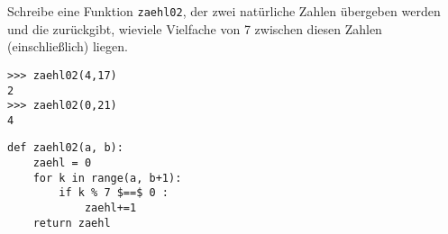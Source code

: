 \question[4] Schreibe eine Funktion \texttt{zaehl02}, der zwei natürliche Zahlen
übergeben werden und die zurückgibt, wieviele Vielfache von 7 zwischen diesen
Zahlen (einschließlich) liegen.
\begin{lstlisting}
>>> zaehl02(4,17)
2
>>> zaehl02(0,21)
4
\end{lstlisting}
\begin{solutionbox}{4cm}
\begin{lstlisting}
def zaehl02(a, b):
    zaehl = 0
    for k in range(a, b+1):
        if k % 7 $==$ 0 :
            zaehl+=1
    return zaehl

\end{lstlisting}
\end{solutionbox}
